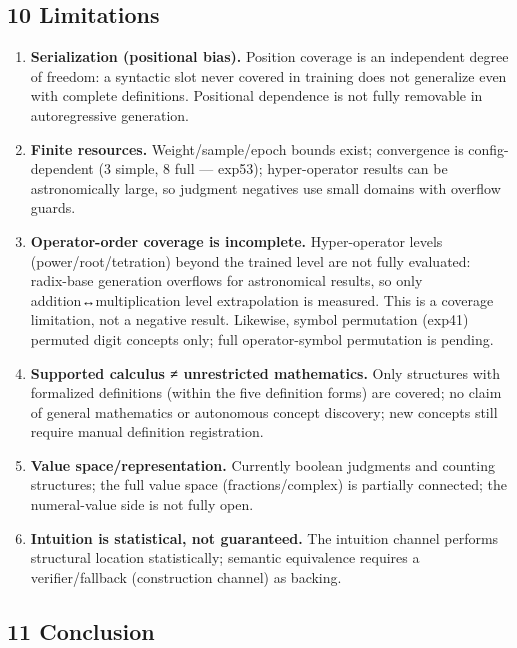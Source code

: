 \documentclass[
]{article}
\providecommand{\tightlist}{%
  \setlength{\itemsep}{0pt}\setlength{\parskip}{0pt}}
\begin{document}
\subsection{10 Limitations}\label{limitations}

\begin{enumerate}
\def\labelenumi{\arabic{enumi}.}
\tightlist
\item
  \textbf{Serialization (positional bias).} Position coverage is an
  independent degree of freedom: a syntactic slot never covered in
  training does not generalize even with complete definitions.
  Positional dependence is not fully removable in autoregressive
  generation.
\item
  \textbf{Finite resources.} Weight/sample/epoch bounds exist;
  convergence is config-dependent (3 simple, 8 full --- exp53);
  hyper-operator results can be astronomically large, so judgment
  negatives use small domains with overflow guards.
\item
  \textbf{Operator-order coverage is incomplete.} Hyper-operator levels
  (power/root/tetration) beyond the trained level are not fully
  evaluated: radix-base generation overflows for astronomical results,
  so only addition↔multiplication level extrapolation is measured. This
  is a coverage limitation, not a negative result. Likewise, symbol
  permutation (exp41) permuted digit concepts only; full operator-symbol
  permutation is pending.
\item
  \textbf{Supported calculus ≠ unrestricted mathematics.} Only
  structures with formalized definitions (within the five definition
  forms) are covered; no claim of general mathematics or autonomous
  concept discovery; new concepts still require manual definition
  registration.
\item
  \textbf{Value space/representation.} Currently boolean judgments and
  counting structures; the full value space (fractions/complex) is
  partially connected; the numeral-value side is not fully open.
\item
  \textbf{Intuition is statistical, not guaranteed.} The intuition
  channel performs structural location statistically; semantic
  equivalence requires a verifier/fallback (construction channel) as
  backing.
\end{enumerate}

\subsection{11 Conclusion}\label{conclusion}
\end{document}
